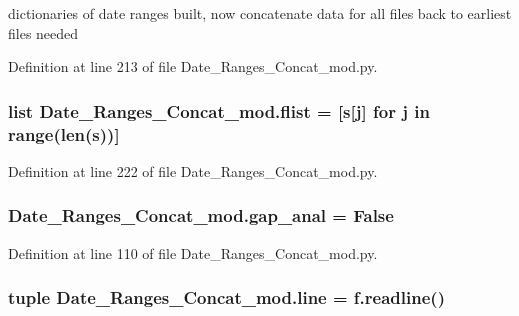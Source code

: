 dictionaries of date ranges built, now concatenate data for all files back to earliest files needed 



Definition at line 213 of file Date\+\_\+\+Ranges\+\_\+\+Concat\+\_\+mod.\+py.

\hypertarget{namespace_date___ranges___concat__mod_af5136898921d16fda0cf4e1f27148e0a}{}
\subsubsection[{flist}]{\setlength{\rightskip}{0pt plus 5cm}list Date\+\_\+\+Ranges\+\_\+\+Concat\+\_\+mod.\+flist = \mbox{[}{\bf s}\mbox{[}j\mbox{]} for j in range(len({\bf s}))\mbox{]}}\label{namespace_date___ranges___concat__mod_af5136898921d16fda0cf4e1f27148e0a}


Definition at line 222 of file Date\+\_\+\+Ranges\+\_\+\+Concat\+\_\+mod.\+py.

\hypertarget{namespace_date___ranges___concat__mod_a73ab5cf3024b5ab0814e9e5b5b681490}{}
\subsubsection[{gap\+\_\+anal}]{\setlength{\rightskip}{0pt plus 5cm}Date\+\_\+\+Ranges\+\_\+\+Concat\+\_\+mod.\+gap\+\_\+anal = False}\label{namespace_date___ranges___concat__mod_a73ab5cf3024b5ab0814e9e5b5b681490}


Definition at line 110 of file Date\+\_\+\+Ranges\+\_\+\+Concat\+\_\+mod.\+py.

\hypertarget{namespace_date___ranges___concat__mod_ad67afc9f4f032da228efc9052cc5a63d}{}
\subsubsection[{line}]{\setlength{\rightskip}{0pt plus 5cm}tuple Date\+\_\+\+Ranges\+\_\+\+Concat\+\_\+mod.\+line = f.\+readline()}\label{namespace_date___ranges___concat__mod_ad67afc9f4f032da228efc9052cc5a63d}


